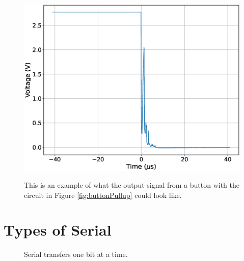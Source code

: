 \begin{figure}[!htb]
	\centering
	\includegraphics[scale=0.5]{buttonSerial/debounce.eps}
	\label{fig:buttonDebounce}
	\caption{This is an example of what the output signal from a button with the circuit in Figure \ref{fig:buttonPullup} could look like.}
\end{figure}


\section{Types of Serial}

\begin{figure}[!htb]
	\centering
	\label{fig:serial}
	\caption{Serial transfers one bit at a time.}
\end{figure}
	
